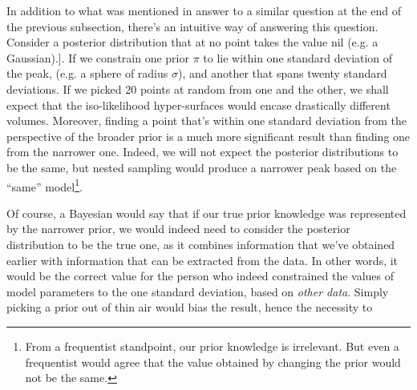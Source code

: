\documentclass[usenatbib]{mnras}
\begin{document}
In addition to what was mentioned in answer to a similar question
at the end of the previous subsection, there's an intuitive way of
answering this question. Consider a posterior distribution that at
no point takes the value nil (e.g. a Gaussian).]. If we constrain one
prior \(\pi\) to lie within one standard deviation of the peak,
(e.g. a sphere of radius \(\sigma\)), and another that spans twenty
standard deviations. If we picked 20 points at random from one and
the other, we shall expect that the iso-likelihood hyper-surfaces
would encase drastically different volumes. Moreover, finding a
point that's within one standard deviation from the perspective of
the broader prior is a much more significant result than finding
one from the narrower one. Indeed, we will not expect the posterior
distributions to be the same, but nested sampling would produce a
narrower peak based on the ``same'' model\footnote{From a   frequentist standpoint, our prior knowledge is irrelevant. But even   a frequentist would agree that the value obtained by changing the   prior would not be the same.}. 

Of course, a Bayesian would say that if our true prior knowledge
was represented by the narrower prior, we would indeed need to
consider the posterior distribution to be the true one, as it
combines information that we've obtained earlier with information
that can be extracted from the data. In other words, it would be
the correct value for the person who indeed constrained the values
of model parameters to the one standard deviation, based on \emph{other
data}. Simply picking a prior out of thin air would bias the result, hence the necessity to 

 

\end{document}
